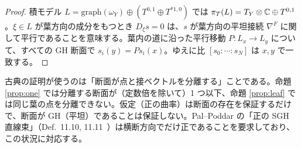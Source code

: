 \begin{proof}
積モデル $L=\mathrm{graph}(\omega_Y)\oplus(T^{0,1}\oplus T^{*1,0})$ では $\pi_T(L)=T_Y\otimes\mathbb C\oplus T^{0,1}$。$\xi\in L$ が葉方向の成分をもつとき $D_\xi s=0$ は、$s$ が葉方向の平坦接続 $\nabla^F$ に関して平行であることを意味する。葉内の道に沿った平行移動 $P:L_x\to L_y$ について、すべての GH 断面で $s_i(y)=Ps_i(x)$。ゆえに比 $[s_0:\cdots:s_N]$ は $x,y$ で一致する。\qedhere
\end{proof}
\begin{rem}[古典の証明のどこが壊れるか]\tP
古典の証明が使うのは「断面が点と接ベクトルを分離する」ことである。命題 \ref{prop:one} では分離する断面が（定数倍を除いて）1 つ以下、命題 \ref{prop:leaf} では同じ葉の点を分離できない。仮定（正の曲率）は断面の存在を保証するだけで、断面が GH（平坦）であることは保証しない。Pal--Poddar の「正の SGH 直線束」（Def.\ 11.10, 11.11\tC\ \tQ）は横断方向でだけ正であることを要求しており、この状況に対応する。
\end{rem}

